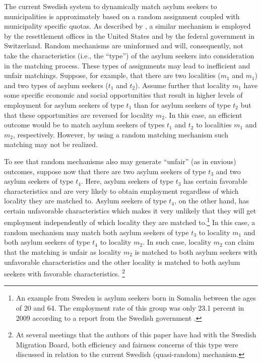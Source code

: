\documentclass[12pt,fleqn]{article}
\begin{document}
The current Swedish system to dynamically match asylum seekers to municipalities is approximately based on a random assignment coupled with municipality specific quotas. As described by \citet[][p.325]{bib:BansakEtAl}, a similar mechanism is employed by the resettlement offices in the United States and by the federal government in Switzerland. Random mechanisms are uninformed and will, consequently, not take the characteristics (i.e., the ``type'') of the asylum seekers into consideration in the matching process. These types of assignments may lead to inefficient and unfair matchings. Suppose, for example, that there are two localities ($m_1$ and $m_1$) and two types of asylum seekers ($t_1$ and $t_2$). Assume further that locality $m_1$ have some specific economic and social opportunities that result in higher levels of employment for asylum seekers of type $t_1$ than for asylum seekers of type $t_2$ but that these opportunities are reversed for locality $m_2$. In this case, an efficient outcome would be to match asylum seekers of types $t_1$ and $t_2$ to localities $m_1$ and $m_2$, respectively. However, by using a random matching mechanism such matching may not be realized.

 To see that random mechanisms also may generate ``unfair'' (as in envious) outcomes, suppose now that there are two asylum seekers of type $t_3$ and two asylum seekers of type $t_4$. Here, asylum seekers of type $t_3$ has certain favorable characteristics and are very likely to obtain employment regardless of which locality they are matched to. Asylum seekers of type $t_4$, on the other hand, has certain unfavorable characteristics which makes it very unlikely that they will get employment independently of which locality they are matched to.\footnote{An example from Sweden is asylum seekers born in Somalia between the ages of 20 and 64. The employment rate of this group was only 23.1 percent in 2009 according to a report from the Swedish government \citep[][p.26]{bib:CarlsonEtAl}.} In this case, a random mechanism may match both asylum seekers of type $t_3$ to locality $m_1$ and both asylum seekers of type $t_4$ to locality $m_2$. In such case, locality $m_2$ can claim that the matching is unfair as locality $m_2$ is matched to both asylum seekers with unfavorable characteristics and the other locality is matched to both asylum seekers with favorable characteristics. \footnote{At several meetings that the authors of this paper have had with the Swedish Migration Board, both efficiency and fairness concerns of this type were discussed in relation to the current Swedish (quasi-random) mechanism.}
\end{document}
